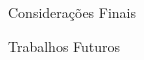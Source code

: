 \begin{chapter}{Considerações Finais}
\begin{section}{Trabalhos Futuros}
\end{section}

\end{chapter}
